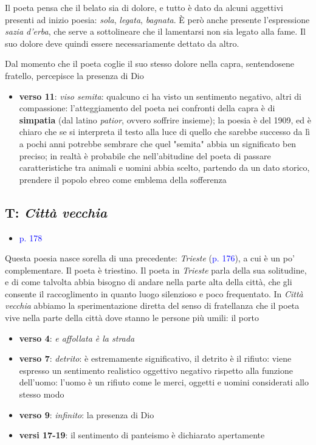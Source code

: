 \documentclass[a4paper, twoside, titlepage]{book}
\newcommand{\elenco}[1]{%
\begin{itemize}
#1
\end{itemize}}
\renewcommand{\emph}[1]{\textcolor{blue}{#1}}
\begin{document}
Il poeta pensa che il belato sia di dolore, e tutto è dato da alcuni aggettivi presenti ad inizio poesia: \textit{sola}, \textit{legata}, \textit{bagnata}.
È però anche presente l'espressione \textit{sazia d'erba}, che serve a sottolineare che il lamentarsi non sia legato alla fame. Il suo dolore deve quindi essere necessariamente dettato da altro.

Dal momento che il poeta coglie il suo stesso dolore nella capra, sentendosene fratello, percepisce la presenza di Dio

\elenco{
	\item \textbf{verso 11}: \textit{viso semita}: qualcuno ci ha visto un sentimento negativo, altri di compassione: l'atteggiamento del poeta nei confronti della capra è di \textbf{simpatia} (dal latino \textit{patior}, ovvero soffrire insieme); la poesia è del 1909, ed è chiaro che se si interpreta il testo alla luce di quello che sarebbe successo da lì a pochi anni potrebbe sembrare che quel "semita" abbia un significato ben preciso; in realtà è probabile che nell'abitudine del poeta di passare caratteristiche tra animali e uomini abbia scelto, partendo da un dato storico, prendere il popolo ebreo come emblema della sofferenza}

\subsection{T: \textit{Città vecchia}}
\elenco{\item \emph{p. 178}}

Questa poesia nasce sorella di una precedente: \textit{Trieste} (\emph{p. 176}), a cui è un po' complementare. Il poeta è triestino.
Il poeta in \textit{Trieste} parla della sua solitudine, e di come talvolta abbia bisogno di andare nella parte alta della città, che gli consente il raccoglimento in quanto luogo silenzioso e poco frequentato.
In \textit{Città vecchia} abbiamo la sperimentazione diretta del senso di fratellanza che il poeta vive nella parte della città dove stanno le persone più umili: il porto

\elenco{
	\item \textbf{verso 4}: \textit{e affollata è la strada}
	\item \textbf{verso 7}: \textit{detrito}: è estremamente significativo, il detrito è il rifiuto: viene espresso un sentimento realistico oggettivo negativo rispetto alla funzione dell'uomo: l'uomo è un rifiuto come le merci, oggetti e uomini considerati allo stesso modo
	\item \textbf{verso 9}: \textit{infinito}: la presenza di Dio
	\item \textbf{versi 17-19}: il sentimento di panteismo è dichiarato apertamente}
\end{document}
